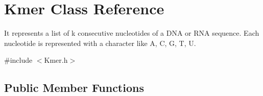 \hypertarget{classKmer}{}\section{Kmer Class Reference}
\label{classKmer}


It represents a list of k consecutive nucleotides of a D\+NA or R\+NA sequence. Each nucleotide is represented with a character like \textquotesingle{}A\textquotesingle{}, \textquotesingle{}C\textquotesingle{}, \textquotesingle{}G\textquotesingle{}, \textquotesingle{}T\textquotesingle{}, \textquotesingle{}U\textquotesingle{}.  




{\ttfamily \#include $<$Kmer.\+h$>$}

\subsection*{Public Member Functions}

